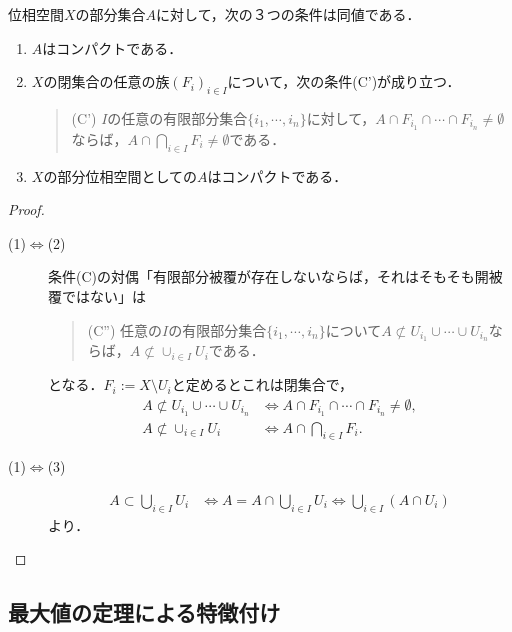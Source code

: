 \documentclass[uplatex,dvipdfmx]{jsreport}
\begin{document}
\begin{proposition}\label{prop-characterization-of-compactness-as-space}
    位相空間$X$の部分集合$A$に対して，次の３つの条件は同値である．
    \begin{enumerate}
        \item $A$はコンパクトである．
        \item $X$の閉集合の任意の族$(F_i)_{i\in I}$について，次の条件(C')が成り立つ．\begin{quote}
            (C') $I$の任意の有限部分集合$\{i_1,\cdots,i_n\}$に対して，$A\cap F_{i_1}\cap\cdots\cap F_{i_n}\ne\emptyset$ならば，$A\cap\bigcap_{i\in I}F_i\ne\emptyset$である．
        \end{quote}
        \item $X$の部分位相空間としての$A$はコンパクトである．
    \end{enumerate}
\end{proposition}
\begin{proof}
    \begin{description}
        \item[(1)$\Leftrightarrow$(2)] 条件(C)の対偶「有限部分被覆が存在しないならば，それはそもそも開被覆ではない」は
        \begin{quote}
            (C'') 任意の$I$の有限部分集合$\{i_1,\cdots,i_n\}$について$A\not\subset U_{i_1}\cup\cdots\cup U_{i_n}$ならば，$A\not\subset \cup_{i\in I}U_i$である．
        \end{quote}
        となる．$F_i:=X\setminus U_i$と定めるとこれは閉集合で，
        \begin{align*}
            A\not\subset U_{i_1}\cup\cdots\cup U_{i_n}&\Leftrightarrow A\cap F_{i_1}\cap\cdots\cap F_{i_n}\ne\emptyset,\\
            A\not\subset \cup_{i\in I}U_i&\Leftrightarrow A\cap\bigcap_{i\in I}F_i.
        \end{align*}
        \item[(1)$\Leftrightarrow$(3)]
        \begin{align*}
            A\subset\bigcup_{i\in I}U_i&\Leftrightarrow A=A\cap\bigcup_{i\in I}U_i\Leftrightarrow \bigcup_{i\in I}(A\cap U_i)
        \end{align*}
        より．
    \end{description}
\end{proof}

\subsection{最大値の定理による特徴付け}
\end{document}
